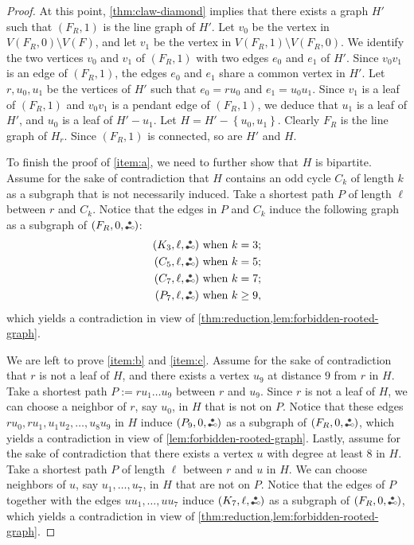 \documentclass[11pt]{article}
\theoremstyle{definition}
\theoremstyle{remark}
\newcommand{\sset}[1]{\left\{{#1}\right\}}
\newcommand{\etwo}{\tikz[baseline=-0.2ex, scale=0.9]{\draw[darkgray, thick] (0,0)--(0.2,0); \draw[darkgray, fill=darkgray] (0,0) circle (0.05); \draw[darkgray, fill=darkgray] (0.1,0.17320508075) circle (0.05); \draw[darkgray, fill=white] (0.2,0) circle (0.05);}}
\newcommand{\ape}[1]{(#1,\etwo)}
\begin{document}
\begin{proof}
    At this point, \cref{thm:claw-diamond} implies that there exists a graph $H'$ such that $(F_R, 1)$ is the line graph of $H'$. Let $v_0$ be the vertex in $V(F_R, 0) \setminus V(F)$, and let $v_1$ be the vertex in $V(F_R, 1) \setminus V(F_R, 0)$. We identify the two vertices $v_0$ and $v_1$ of $(F_R, 1)$ with two edges $e_0$ and $e_1$ of $H'$. Since $v_0v_1$ is an edge of $(F_R, 1)$, the edges $e_0$ and $e_1$ share a common vertex in $H'$. Let $r, u_0, u_1$ be the vertices of $H'$ such that $e_0 = ru_0$ and $e_1 = u_0u_1$. Since $v_1$ is a leaf of $(F_R, 1)$ and $v_0v_1$ is a pendant edge of $(F_R, 1)$, we deduce that $u_1$ is a leaf of $H'$, and $u_0$ is a leaf of $H' - u_1$. Let $H = H' - \sset{u_0, u_1}$. Clearly $F_R$ is the line graph of $H_r$. Since $(F_R, 1)$ is connected, so are $H'$ and $H$.
    
    To finish the proof of \ref{item:a}, we need to further show that $H$ is bipartite. Assume for the sake of contradiction that $H$ contains an odd cycle $C_k$ of length $k$ as a subgraph that is not necessarily induced. Take a shortest path $P$ of length $\ell$ between $r$ and $C_k$. Notice that the edges in $P$ and $C_k$ induce the following graph as a subgraph of $\ape{F_R, 0}$:
    \begin{align*}
        \ape{K_3, \ell} & \text{ when } k = 3; \\
        \ape{C_5, \ell} & \text{ when } k = 5; \\
        \ape{C_7, \ell} & \text{ when } k = 7; \\
        \ape{P_7, \ell} & \text{ when } k \ge 9,
    \end{align*}
    which yields a contradiction in view of \cref{thm:reduction,lem:forbidden-rooted-graph}.

    We are left to prove \ref{item:b} and \ref{item:c}. Assume for the sake of contradiction that $r$ is not a leaf of $H$, and there exists a vertex $u_9$ at distance $9$ from $r$ in $H$. Take a shortest path $P := ru_1\dots u_9$ between $r$ and $u_9$. Since $r$ is not a leaf of $H$, we can choose a neighbor of $r$, say $u_0$, in $H$ that is not on $P$. Notice that these edges $ru_0, ru_1, u_1u_2, \dots, u_8u_9$ in $H$ induce $\ape{P_9, 0}$ as a subgraph of $\ape{F_R, 0}$, which yields a contradiction in view of \cref{lem:forbidden-rooted-graph}. Lastly, assume for the sake of contradiction that there exists a vertex $u$ with degree at least $8$ in $H$. Take a shortest path $P$ of length $\ell$ between $r$ and $u$ in $H$. We can choose neighbors of $u$, say $u_1, \dots, u_7$, in $H$ that are not on $P$. Notice that the edges of $P$ together with the edges $uu_1, \dots, uu_7$ induce $\ape{K_7, \ell}$ as a subgraph of $\ape{F_R, 0}$, which yields a contradiction in view of \cref{thm:reduction,lem:forbidden-rooted-graph}.
\end{proof}
\end{document}
